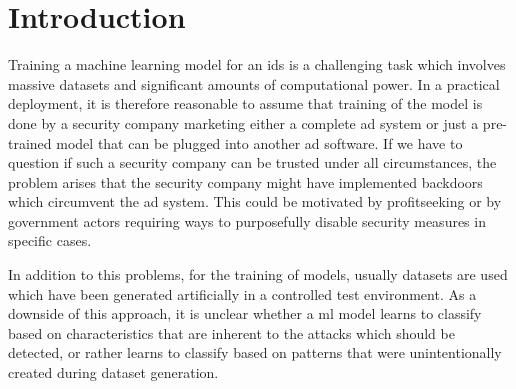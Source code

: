 \documentclass[10pt,sigconf,letterpaper,dvipsnames]{acmart}
\begin{document}

\maketitle

\section{Introduction}

Training a machine learning model for an \gls{ids} is a challenging task which involves massive datasets and significant amounts of computational power. In a practical deployment, it is therefore reasonable to assume that training of the model is done by a security company marketing either a complete \gls{ad} system or just a pre-trained model that can be plugged into another \gls{ad} software. %
If we have to question if such a security company can be trusted under all circumstances, the problem arises that the security company might have implemented backdoors which circumvent the \gls{ad} system. This could be motivated by profitseeking or by government actors requiring ways to purposefully disable security measures in specific cases.

In addition to this problems, for the training of models, usually datasets are used which have been generated artificially in a controlled test environment. As a downside of this approach, it is unclear whether a \gls{ml} model learns to classify based on characteristics that are inherent to the attacks which should be detected, or rather learns to classify based on patterns that were unintentionally created during dataset generation.
\end{document}
